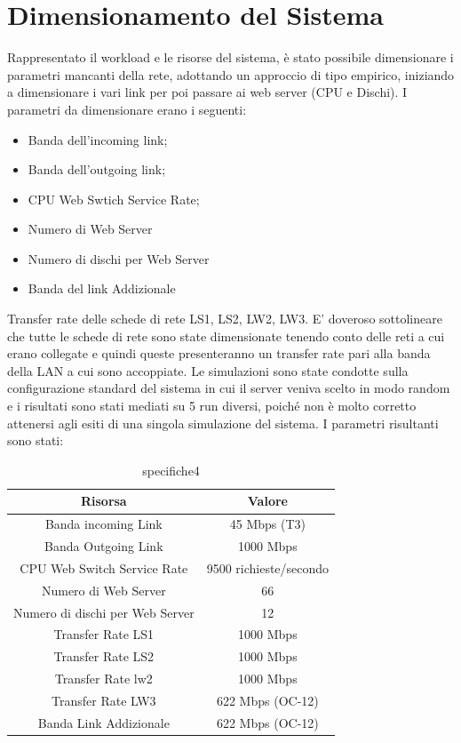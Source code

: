 \section{Dimensionamento del Sistema}
Rappresentato il workload e le risorse del sistema, è stato possibile dimensionare i parametri mancanti della rete, adottando un approccio di tipo empirico, iniziando a dimensionare i vari link per poi passare ai web server (CPU e Dischi). 
I parametri da dimensionare erano i seguenti:
\begin{itemize}
	\item Banda dell'incoming link;
	\item Banda dell'outgoing link;
	\item CPU Web Swtich Service Rate;
	\item Numero di Web Server
	\item Numero di dischi per Web Server
	\item Banda del link Addizionale
\end{itemize}
Transfer rate delle schede di rete LS1, LS2, LW2, LW3.
E' doveroso sottolineare che tutte le schede di rete sono state dimensionate tenendo conto delle reti a cui erano collegate e quindi queste presenteranno un transfer rate pari alla banda della LAN a cui sono accoppiate. Le simulazioni sono state condotte sulla configurazione standard del sistema in cui il server veniva scelto in modo random e  i risultati sono stati mediati su 5 run diversi, poiché non è molto corretto attenersi agli esiti di una singola simulazione del sistema. I parametri risultanti sono stati:
\begin{table}[H]
\begin{center}
\begin{tabular}{||c|c||}
\hline
Risorsa		&Valore\\
\hline
Banda incoming Link	&45 Mbps (T3)\\
\hline
Banda Outgoing Link	&1000 Mbps\\
\hline
CPU Web Switch Service Rate		&9500 richieste/secondo\\
\hline
Numero di Web Server		&66\\
\hline
Numero di dischi per Web Server	&12\\
\hline
Transfer Rate LS1		&1000 Mbps\\
\hline
Transfer Rate LS2		&1000 Mbps\\
\hline
Transfer Rate lw2		&1000 Mbps\\
\hline
Transfer Rate LW3		&622 Mbps (OC-12)\\
\hline
Banda Link Addizionale	&622 Mbps (OC-12)\\
\hline
\end{tabular}
\end{center}
\caption{specifiche4}
\label{test_4}
\end{table}

